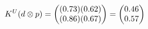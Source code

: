 \documentclass[preview]{standalone}
\begin{document}
\begin{align*}
\special{dvisvgm:raw <g id='unique000'>}K^U(d \otimes p) = \begin{pmatrix} (0.73)(0.62) \\ (0.86)(0.67) \end{pmatrix} = \begin{pmatrix} 0.46 \\ 0.57 \end{pmatrix}\special{dvisvgm:raw </g>}
\end{align*}
\end{document}
